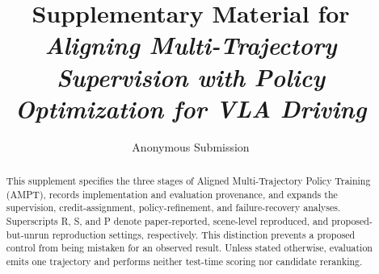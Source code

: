 \documentclass[10pt,twocolumn]{article}
\title{Supplementary Material for\\
\textit{Aligning Multi-Trajectory Supervision with Policy Optimization for VLA Driving}}
\author{Anonymous Submission}
\date{}
\begin{document}
\maketitle
\begin{abstract}
This supplement specifies the three stages of Aligned Multi-Trajectory Policy
Training (AMPT), records implementation and evaluation provenance, and expands
the supervision, credit-assignment, policy-refinement, and failure-recovery
analyses.  Superscripts R, S, and P denote paper-reported, scene-level
reproduced, and proposed-but-unrun reproduction settings, respectively.  This
distinction prevents a proposed control from being mistaken for an observed
result.  Unless stated otherwise, evaluation emits one trajectory and performs
neither test-time scoring nor candidate reranking.
\end{abstract}

\appendix











\end{document}
